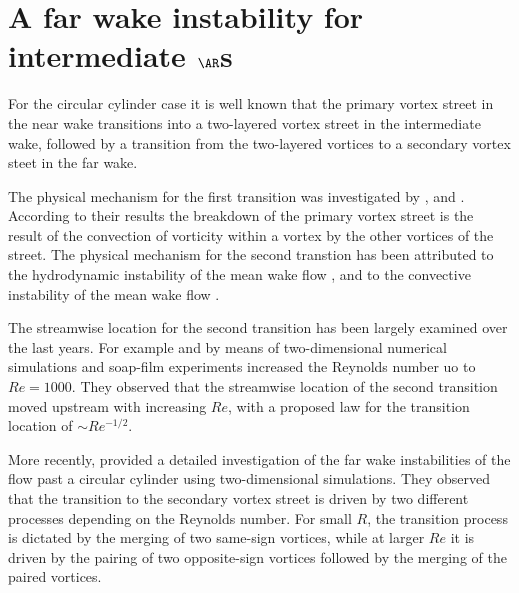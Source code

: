 \section{A far wake instability for intermediate $\AR$s}
\label{sec:farwake}

For the circular cylinder case it is well known \citep{vorobieff-goergiev-ingber-2002,kumar-mittal-2012} that the primary vortex street in the near wake transitions into a two-layered vortex street in the intermediate wake, followed by a transition from the two-layered vortices to a secondary vortex steet in the far wake.

The physical mechanism for the first transition was investigated by \cite{durgin-karlsson-1971}, \cite{karasudani-funakoshi-1994} and \cite{dynnikova-guverntuk-2016}. According to their results the breakdown of the primary vortex street is the result of the convection of vorticity within a vortex by the other vortices of the street. The physical mechanism for the second transtion has been attributed to the hydrodynamic instability of the mean wake flow \citep{cimbala-nagib-roshko-1988,williamson-prasad-1993}, and to the convective instability of the mean wake flow \citep{kumar-mittal-2012}.

The streamwise location for the second transition has been largely examined over the last years. For example \cite{inoue-yamazaki-1999} and  \cite{vorobieff-etal-2002} by means of two-dimensional numerical simulations and soap-film experiments increased the Reynolds number uo to $Re=1000$. They observed that the streamwise location of the second transition moved upstream with increasing $Re$, with a proposed law for the transition location of $\sim Re^{-1/2}$. 

More recently, \cite{jiang-cheng-2019} provided a detailed investigation of the far wake instabilities of the flow past a circular cylinder using two-dimensional simulations. They observed that the transition to the secondary vortex street is driven by two different processes depending on the Reynolds number. For small $R$, the transition process is dictated by the merging of two same-sign vortices, while at larger $Re$ it is driven by the pairing of two opposite-sign vortices followed by the merging of the paired vortices.


